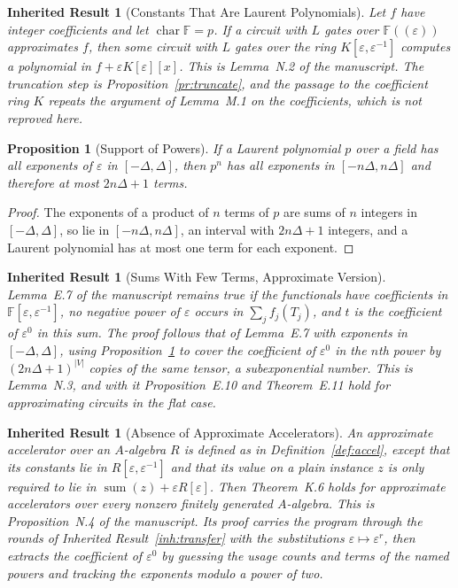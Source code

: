 \documentclass[11pt,letterpaper]{report}
\theoremstyle{plain}
\newtheorem{proposition}[theorem]{Proposition}
\newtheorem{inherited}[theorem]{Inherited Result}
\theoremstyle{definition}
\theoremstyle{remark}
\begin{document}
\begin{inherited}[Constants That Are Laurent Polynomials]\label{inh:laurent}
Let $f$ have integer coefficients and let $\operatorname{char}\mathbb F=p$. If a circuit with $L$ gates over $\mathbb F((\varepsilon))$ approximates $f$, then some circuit with $L$ gates over the ring $K[\varepsilon,\varepsilon^{-1}]$ computes a polynomial in $f+\varepsilon K[\varepsilon][x]$. This is Lemma~N.2 of the manuscript. The truncation step is Proposition~\ref{pr:truncate}, and the passage to the coefficient ring $K$ repeats the argument of Lemma~M.1 on the coefficients, which is not reproved here.
\end{inherited}

\begin{proposition}[Support of Powers]\label{pr:support}
If a Laurent polynomial $p$ over a field has all exponents of $\varepsilon$ in $[-\Delta,\Delta]$, then $p^n$ has all exponents in $[-n\Delta,n\Delta]$ and therefore at most $2n\Delta+1$ terms.
\end{proposition}
\begin{proof}
The exponents of a product of $n$ terms of $p$ are sums of $n$ integers in $[-\Delta,\Delta]$, so lie in $[-n\Delta,n\Delta]$, an interval with $2n\Delta+1$ integers, and a Laurent polynomial has at most one term for each exponent.
\end{proof}

\begin{inherited}[Sums With Few Terms, Approximate Version]\label{inh:fewapprox}
Lemma~E.7 of the manuscript remains true if the functionals have coefficients in $\mathbb F[\varepsilon,\varepsilon^{-1}]$, no negative power of $\varepsilon$ occurs in $\sum_jf_j(T_j)$, and $t$ is the coefficient of $\varepsilon^0$ in this sum. The proof follows that of Lemma~E.7 with exponents in $[-\Delta,\Delta]$, using Proposition~\ref{pr:support} to cover the coefficient of $\varepsilon^0$ in the $n$th power by $(2n\Delta+1)^{|V|}$ copies of the same tensor, a subexponential number. This is Lemma~N.3, and with it Proposition~E.10 and Theorem~E.11 hold for approximating circuits in the flat case.
\end{inherited}

\begin{inherited}[Absence of Approximate Accelerators]\label{inh:noapproxacc}
An approximate accelerator over an $A$-algebra $R$ is defined as in Definition~\ref{def:accel}, except that its constants lie in $R[\varepsilon,\varepsilon^{-1}]$ and that its value on a plain instance $z$ is only required to lie in $\operatorname{sum}(z)+\varepsilon R[\varepsilon]$. Then Theorem~K.6 holds for approximate accelerators over every nonzero finitely generated $A$-algebra. This is Proposition~N.4 of the manuscript. Its proof carries the program through the rounds of Inherited Result~\ref{inh:transfer} with the substitutions $\varepsilon\mapsto\varepsilon^r$, then extracts the coefficient of $\varepsilon^0$ by guessing the usage counts and terms of the named powers and tracking the exponents modulo a power of two.
\end{inherited}
\end{document}
